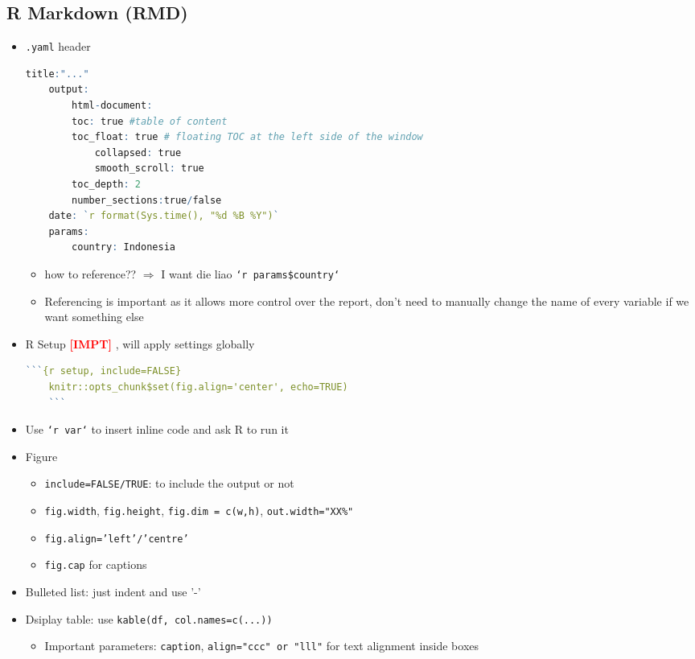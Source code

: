 \documentclass{article}
\newcommand{\impt}[0]{\textcolor{red}{\textbf{[IMPT] }}}
\begin{document}
\begin{multicols}{2}
\section{R Markdown (RMD)}
\begin{itemize}
	\item \texttt{.yaml} header
	\begin{lstlisting}[language=R]
	title:"..."
	output:
		html-document:
		toc: true #table of content
		toc_float: true # floating TOC at the left side of the window
			collapsed: true
			smooth_scroll: true
		toc_depth: 2
		number_sections:true/false
	date: `r format(Sys.time(), "%d %B %Y")`
	params:
		country: Indonesia
	\end{lstlisting}
\begin{itemize}
	\item how to reference?? $\Rightarrow$ I want die liao \texttt{`r params\$country`}
	\item Referencing is important as it allows more control over the report, don't need to manually change the name of every variable if we want something else
\end{itemize}

	\item R Setup \impt , will apply settings globally
	\begin{lstlisting}[language=R]
	```{r setup, include=FALSE}
	knitr::opts_chunk$set(fig.align='center', echo=TRUE)
	```\end{lstlisting}
	\item Use \texttt{`r var`} to insert inline code and ask R to run it
	\item Figure
	\begin{itemize}
		\item \texttt{include=FALSE/TRUE}: to include the output or not
		\item \texttt{fig.width}, \texttt{fig.height}, \texttt{fig.dim = c(w,h)}, \texttt{out.width="XX\%"}
		\item \texttt{fig.align='left'/'centre'}
		\item \texttt{fig.cap} for captions
	\end{itemize}
	\item Bulleted list: just indent and use '-'
	\item Dsiplay table: use \texttt{kable(df, col.names=c(...))}
	\begin{itemize}
		\item Important parameters: \texttt{caption}, \texttt{align="ccc" or "lll"} for text alignment inside boxes
	\end{itemize}
\end{itemize}


\end{multicols}
\end{document}
